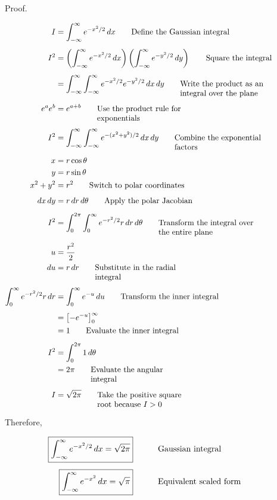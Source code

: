 \documentclass{article}
\newcommand{\justwidth}{0.36\textwidth}
\newcommand{\just}[1]{\parbox[t]{\justwidth}{\raggedright #1}}
\begin{document}
Proof.

\begin{align*}
I
&=
\int_{-\infty}^{\infty}
e^{-x^2/2}\,dx
\tag*{\just{Define the Gaussian integral}}
\\[0.45em]
I^2
&=
\left(
\int_{-\infty}^{\infty}
e^{-x^2/2}\,dx
\right)
\left(
\int_{-\infty}^{\infty}
e^{-y^2/2}\,dy
\right)
\tag*{\just{Square the integral}}
\\[0.45em]
&=
\int_{-\infty}^{\infty}
\int_{-\infty}^{\infty}
e^{-x^2/2}
e^{-y^2/2}
\,dx\,dy
\tag*{\just{Write the product as an integral over the plane}}
\\[0.45em]
e^ae^b
&=
e^{a+b}
\tag*{\just{Use the product rule for exponentials}}
\\[0.45em]
I^2
&=
\int_{-\infty}^{\infty}
\int_{-\infty}^{\infty}
e^{-(x^2+y^2)/2}
\,dx\,dy
\tag*{\just{Combine the exponential factors}}
\\[0.45em]
x
&=
r\cos\theta
\\
y
&=
r\sin\theta
\\
x^2+y^2
&=
r^2
\tag*{\just{Switch to polar coordinates}}
\\[0.45em]
dx\,dy
&=
r\,dr\,d\theta
\tag*{\just{Apply the polar Jacobian}}
\\[0.45em]
I^2
&=
\int_0^{2\pi}
\int_0^\infty
e^{-r^2/2}
r\,dr\,d\theta
\tag*{\just{Transform the integral over the entire plane}}
\\[0.45em]
u
&=
\frac{r^2}{2}
\\
du
&=
r\,dr
\tag*{\just{Substitute in the radial integral}}
\\[0.45em]
\int_0^\infty
e^{-r^2/2}
r\,dr
&=
\int_0^\infty
e^{-u}\,du
\tag*{\just{Transform the inner integral}}
\\[0.45em]
&=
\left[
-e^{-u}
\right]_0^\infty
\\
&=
1
\tag*{\just{Evaluate the inner integral}}
\\[0.45em]
I^2
&=
\int_0^{2\pi}
1\,d\theta
\\
&=
2\pi
\tag*{\just{Evaluate the angular integral}}
\\[0.45em]
I
&=
\sqrt{2\pi}
\tag*{\just{Take the positive square root because $I>0$}}
\end{align*}

Therefore,

\begin{align*}
\boxed{
\int_{-\infty}^{\infty}
e^{-x^2/2}\,dx
=
\sqrt{2\pi}
}
&&
\tag*{\just{Gaussian integral}}
\\[0.45em]
\boxed{
\int_{-\infty}^{\infty}
e^{-x^2}\,dx
=
\sqrt{\pi}
}
&&
\tag*{\just{Equivalent scaled form}}
\end{align*}
\end{document}
